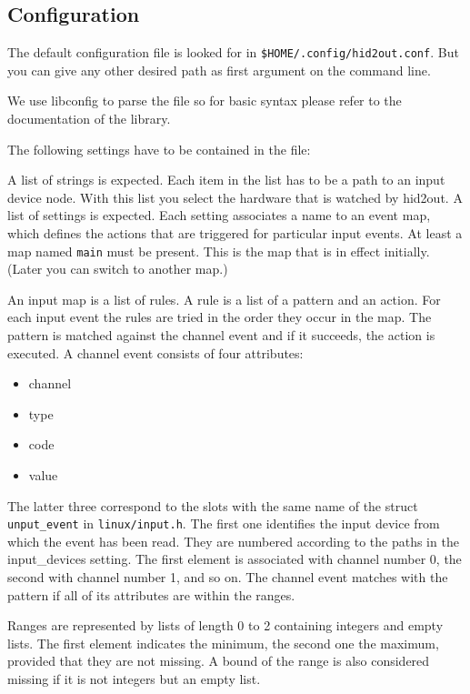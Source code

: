 \subsection{Configuration}
The default configuration file is looked for in 
\verb|$HOME/.config/hid2out.conf|. But you can give any other 
desired path as first argument on the command line.

We use libconfig to parse the file so for basic syntax please 
refer to the documentation of the library.

The following settings have to be contained in the  file:
\begin{pdescription}
  A list of strings is expected. Each item in the list 
  has to be a path to an input device node.
  With this list you select the hardware that is watched by
  hid2out.
  A list of settings is expected.
  Each setting associates a name to an event map, which
  defines the actions that are triggered for particular input events.
  At least a map named \texttt{main} must be present.
  This is the map that is in effect initially.
  (Later you can switch to another map.)

  An input map is a list of rules.
  A rule is a list of a pattern and an action.
  For each input event the rules are tried in the order they occur in the map.
  The pattern is matched against the channel event and if it succeeds, the 
  action is executed.
  A channel event consists of four attributes:
  \begin{itemize}
  \item channel
  \item type
  \item code
  \item value
  \end{itemize}
  The latter three correspond to the slots with the same name of 
  the struct \texttt{unput\_event} in \texttt{linux/input.h}.
  The first one identifies the input device from which the event has been
  read. They are numbered according to the paths in the input\_devices setting.
  The first element is associated with channel number 0, the second with channel
  number 1, and so on.
  The channel event matches with the pattern if all of its attributes
  are within the ranges.
  
  Ranges are represented by lists of length 0 to 2
  containing integers and empty lists.
  The first element indicates the minimum,
  the second one the maximum, provided that they are not missing.
  A bound of the range is also considered missing if it is not integers but 
  an empty list.


\end{pdescription}

